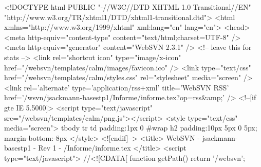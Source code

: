 <!DOCTYPE html PUBLIC "-//W3C//DTD XHTML 1.0 Transitional//EN" "http://www.w3.org/TR/xhtml1/DTD/xhtml1-transitional.dtd">
<html xmlns="http://www.w3.org/1999/xhtml" xml:lang="en" lang="en">
<head>
  <meta http-equiv="content-type" content="text/html;charset=UTF-8" />
  <meta http-equiv="generator" content="WebSVN 2.3.1" /> <!-- leave this for stats -->
  <link rel="shortcut icon" type="image/x-icon" href="/websvn/templates/calm/images/favicon.ico" />
  <link type="text/css" href="/websvn/templates/calm/styles.css" rel="stylesheet" media="screen" />
  <link rel='alternate' type='application/rss+xml' title='WebSVN RSS' href='/wsvn/jsackmann-basestp1/Informe/informe.tex?op=rss&amp;' />
  <!--[if gte IE 5.5000]>
  <script type="text/javascript" src="/websvn/templates/calm/png.js"></script>
  <style type="text/css" media="screen">
  tbody tr td { padding:1px 0 }
  #wrap h2 { padding:10px 5px 0 5px; margin-bottom:-8px }
  </style>
  <![endif]-->
  <title>
       WebSVN
          - jsackmann-basestp1
               - Rev 1
            - /Informe/informe.tex
  </title>
  <script type="text/javascript">
  //<![CDATA[
       function getPath()
       {
         return '/websvn';
       }
       

